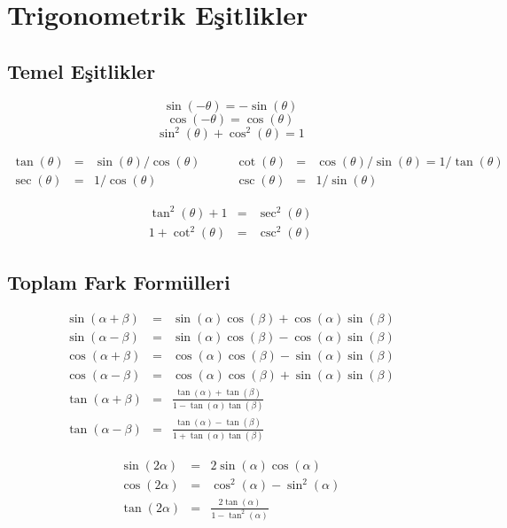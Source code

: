 \section{Trigonometrik Eşitlikler}

\subsection*{Temel Eşitlikler}
\[ \sin(-\theta) = -\sin(\theta) \]
\[ \cos(-\theta) = \cos(\theta) \]
\[ \sin^2(\theta) + \cos^2(\theta) = 1 \]

\[
\begin{array}{rclrcl}
\tan(\theta) &=& \sin(\theta)/\cos(\theta)\quad & \quad
\cot(\theta) &=& \cos(\theta)/\sin(\theta) = 1/\tan(\theta)\\
\sec(\theta) &=& 1/\cos(\theta)\quad & \quad
\csc(\theta) &=& 1/\sin(\theta)
\end{array}
\]

\begin{eqnarray*}
\tan^2(\theta) + 1 &=& \sec^2(\theta)\\
1 + \cot^2(\theta) &=& \csc^2(\theta)
\end{eqnarray*}

\subsection*{Toplam Fark Formülleri}

\begin{eqnarray*}
\sin(\alpha+\beta) &=& \sin(\alpha)\cos(\beta) + \cos(\alpha)\sin(\beta) \\
\sin(\alpha-\beta) &=& \sin(\alpha)\cos(\beta) - \cos(\alpha)\sin(\beta) \\
\cos(\alpha+\beta) &=& \cos(\alpha)\cos(\beta) - \sin(\alpha)\sin(\beta) \\
\cos(\alpha-\beta) &=& \cos(\alpha)\cos(\beta) + \sin(\alpha)\sin(\beta) \\
\tan(\alpha+\beta) &=& \frac{\tan(\alpha) + \tan(\beta)}{1 - \tan(\alpha)\tan(\beta)} \\
\tan(\alpha-\beta) &=& \frac{\tan(\alpha) - \tan(\beta)}{1 + \tan(\alpha)\tan(\beta)}
\end{eqnarray*}

\begin{eqnarray*}
\sin(2\alpha) &=&  2\sin(\alpha)\cos(\alpha) \\
\cos(2\alpha) &=& \cos^2(\alpha) - \sin^2(\alpha) \\
\tan(2\alpha) &=& \frac{2\tan(\alpha)}{1-\tan^2(\alpha)}
\end{eqnarray*}

